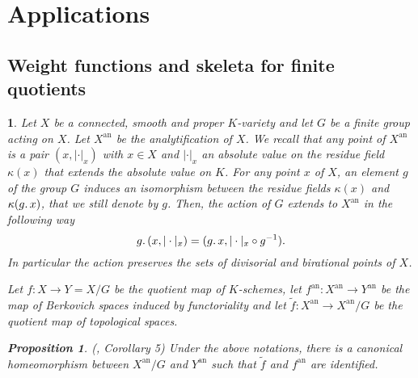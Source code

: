 \documentclass{amsart}%
\numberwithin{equation}{subsection}
\theoremstyle{plain2}
\newtheorem{prop}[equation]{Proposition}
\theoremstyle{definition2}
\theoremstyle{stepstyle}
\theoremstyle{point}
\theoremstyle{subpoint}
\newtheorem{subpoint}[equation]{}%
\newcommand{\spa}[1]{\begin{subpoint}#1\end{subpoint}}           %
\newcommand{\an}{\mathrm{an}}
\begin{document}
\section{Applications}
\subsection{Weight functions and skeleta for finite quotients}

\spa{Let $X$ be a connected, smooth  and proper $K$-variety and let $G$ be a finite group acting on $X$. Let $X^{\an}$ be the analytification of $X$. We recall that any point of $X^{\an}$ is a pair $(x,|\cdot|_x)$ with $x \in X$ and $|\cdot|_x$ an absolute value on the residue field $\kappa(x)$ that extends the absolute value on $K$. For any point $x$ of $X$, an element $g$ of the group $G$ induces an isomorphism between the residue fields $\kappa(x)$ and $\kappa(g \ldotp x)$, that we still denote by $g$. Then, the action of $G$ extends to $X^\an$ in the following way $$g \ldotp (x,|\cdot|_x) = ( g \ldotp x,  |\cdot|_x \circ g^{-1}).$$ In particular the action preserves the sets of divisorial and birational points of $X$.

Let $f: X \rightarrow Y=X/G$ be the quotient map of $K$-schemes, let $f^\an: X^\an \rightarrow Y^\an$ be the map of Berkovich spaces induced by functoriality and let $\tilde{f}: X^\an \rightarrow X^\an/G$ be the quotient map of topological spaces.
\begin{prop} (\cite{Berkovich}, Corollary 5) \label{prop Berk identification of quotient}
Under the above notations, there is a canonical homeomorphism between $X^\an/G $ and $Y^\an$ such that $\tilde{f}$ and $f^\an$ are identified.
\end{prop}
}
\end{document}
